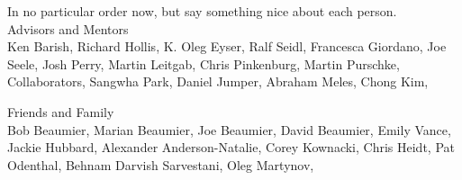 
In no particular order now, but say something nice about each person.\\

Advisors and Mentors \\
  Ken Barish, 
  Richard Hollis, 
  K. Oleg Eyser, 
  Ralf Seidl, 
  Francesca Giordano, 
  Joe Seele, 
  Josh Perry, 
  Martin Leitgab, 
  Chris Pinkenburg, 
  Martin Purschke, 
  Collaborators, 
  Sangwha Park, 
  Daniel Jumper, 
  Abraham Meles,
  Chong Kim, 

Friends and Family \\
  Bob Beaumier, 
  Marian Beaumier, 
  Joe Beaumier, 
  David Beaumier, 
  Emily Vance, 
  Jackie Hubbard, 
  Alexander Anderson-Natalie, 
  Corey Kownacki, 
  Chris Heidt, 
  Pat Odenthal, 
  Behnam Darvish Sarvestani, 
  Oleg Martynov, 
